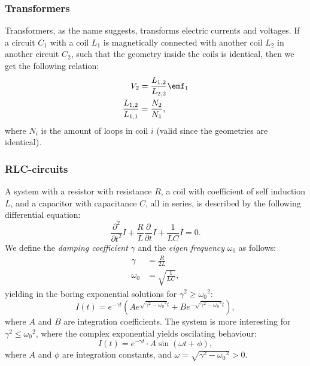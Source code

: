     \subsubsection{Transformers}
        \label{transformers}
        Transformers, as the name suggests, transforms electric currents and voltages. 
        If a circuit $C_1$ with a coil $L_1$ is magnetically connected with another coil $L_2$ in another circuit $C_2$, 
        such that the geometry inside the coils is identical, then we get the following relation: 
        \begin{align}
            V_2 &= \frac{L_{1,2}}{L_{2,2}}\emf_1 \\
            \frac{L_{1,2}}{L_{1,1}} &= \frac{N_2}{N_1},
        \end{align}
        where $N_i$ is the amount of loops in coil $i$ (valid since the geometries are identical).

    \subsubsection{RLC-circuits}
        A system with a resistor with resistance $R$, a coil with coefficient of self induction $L$, and a capacitor with capacitance $C$, 
        all in series, is described by the following differential equation: 
        \begin{equation} \label{Current in RLC}
            \frac{\partial^2}{\partial t^2}I + \frac{R}{L}\frac{\partial}{\partial t}I + \frac{1}{LC}I = 0.
        \end{equation}
        We define the \textit{damping coefficient} $\gamma$ and the \textit{eigen frequency} $\omega_0$ as follows:
        \begin{align*}
            \gamma &= \frac{R}{2L}\\
            \omega_0 &= \sqrt{\frac{1}{LC}},
        \end{align*}
        yielding in the boring exponential solutions for $\gamma^2 \geq {\omega_0}^2$:
        \begin{equation}
            I(t) = e^{-\gamma t}\left(Ae^{\sqrt{\gamma^2 - {\omega_0}^2}t}+Be^{-\sqrt{\gamma^2 - {\omega_0}^2}t}\right),
        \end{equation}
        where $A$ and $B$ are integration coefficients. The system is more interesting for $\gamma^2 \leq {\omega_0}^2$,
        where the complex exponential yields oscilating behaviour:
        \begin{equation}
            I(t) = e^{-\gamma t}\cdot A\sin\left(\omega t + \phi\right),
        \end{equation}
        where $A$ and $\phi$ are integration constants, and $\omega = \sqrt{\gamma^2 - {\omega_0}^2} > 0$.

